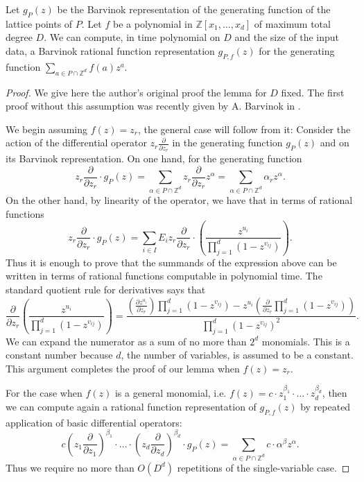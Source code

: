 \documentclass[twoside]{article}
\newcommand{\Z}{\mathbb Z}
\newcommand{\1}{{\bf 1}}
\begin{document}
\begin{lemma} \label{operators} Let $g_P(z)$ be the Barvinok 
  representation of the generating function of the lattice points of
  $P$. Let $f$ be a polynomial in $\Z[x_1,\dots,x_d]$ of maximum total
  degree $D$. We can compute, in time polynomial on $D$ and the size of the
  input data, a Barvinok rational function representation $g_{P,f}(z)$
  for the generating function $\sum_{a\in P \cap \Z^d} f(a) z^a.$
\end{lemma}

\begin{proof} We give here the author's original proof the lemma for $D$
  fixed. The first proof without this assumption was recently given by
  A. Barvinok in \cite{newbar}. 
  
  We begin assuming $f(z)=z_r$, the general case will follow from it:
  Consider the action of the differential operator
  $z_r\frac{\partial}{\partial z_r}$ in the generating function
  $g_P(z)$ and on its Barvinok representation.  On one hand, for the
  generating function
\[
z_r\frac{\partial}{\partial z_r}\cdot g_P(z)=\sum\limits_{\alpha\in
  P \cap \Z^d} z_r \frac{\partial}{\partial z_r} z^\alpha=
\sum\limits_{\alpha\in P \cap \Z^d}\alpha_r z^\alpha.
\]
On the other hand, by linearity of the operator, we have that in terms
of rational functions
\[
z_r\frac{\partial}{\partial z_r}\cdot g_P(z)=\sum\limits_{i \in I} E_i
z_r\frac{\partial}{\partial z_r}\cdot \left( \frac{z^{u_i}} {\prod
\limits_{j=1}^d (1-z^{v_{ij}})}\right).
\]
Thus it is enough to prove that the summands of the expression above
can be written in terms of rational functions computable in polynomial
time. The standard quotient rule for derivatives says that
\[
\frac{\partial}{\partial z_r} \left(\frac{z^{u_i}} {\prod
\limits_{j=1}^d (1-z^{v_{ij}})}\right)=\frac{(\frac{\partial z^{u_i} }{\partial
z_r}) \prod^d_{j=1}(1-z^{v_{ij}})
-z^{u_i}(\frac{\partial}{\partial z_r}
\prod_{j=1}^d(1-z^{v_{ij}}))} {\prod_{j=1}^d(1-z^{v_{ij}})^2}.
\]
We can expand the numerator as a sum of no more than $2^d$ monomials.
This is a constant number because $d$, the number of variables, is
assumed to be a constant. This argument completes the proof of
our lemma when $f(z)=z_r$. 

For the case when $f(z)$ is a general monomial, i.e. $f(z)=c\cdot
z_1^{\beta_1}\cdot\ldots\cdot z_d^{\beta_d}$, then we can compute
again a rational function representation of $g_{P,f}(z)$ by repeated
application of basic differential operators:
\[
c\left(z_1\frac{\partial}{\partial z_1}\right)^{\beta_1}
\cdot\ldots\cdot \left(z_d \frac{\partial}{\partial
z_d}\right)^{\beta_d}\cdot g_P(z)=\sum\limits_{\alpha\in P \cap \Z^d} c\cdot
\alpha^{\beta} z^\alpha.
\]
Thus we require no more than $O(D^d)$ repetitions of the single-variable
case. 


\end{proof}
\end{document}
